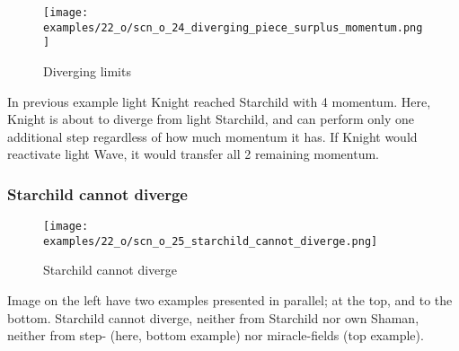 
\vspace*{0.4\baselineskip}
\noindent
\begin{wrapfigure}[9]{l}{0.4\textwidth}
\centering
\texttt{[image: examples/22\_o/scn\_o\_24\_diverging\_piece\_surplus\_momentum.png]}
\vspace*{-0.4\baselineskip}
\caption{Diverging limits}
\label{fig:scn_o_24_diverging_piece_surplus_momentum}
\end{wrapfigure}
In previous example light Knight reached Starchild with 4 momentum. Here, Knight
is about to diverge from light Starchild, and can perform only one additional step
regardless of how much momentum it has. If Knight would reactivate light Wave, it
would transfer all 2 remaining momentum.


\clearpage %

\subsubsection*{Starchild cannot diverge}
\label{sec:One/Starchild/Divergence/Starchild cannot diverge}

\vspace*{-0.9\baselineskip}
\noindent
\begin{wrapfigure}[8]{l}{0.4\textwidth}
\centering
\texttt{[image: examples/22\_o/scn\_o\_25\_starchild\_cannot\_diverge.png]}
\vspace*{-0.4\baselineskip}
\caption{Starchild cannot diverge}
\label{fig:scn_o_25_starchild_cannot_diverge}
\end{wrapfigure}
Image on the left have two examples presented in parallel; at the top, and to the
bottom.\newline
\indent
Starchild cannot diverge, neither from Starchild nor own Shaman, neither from step-
(here, bottom example) nor miracle-fields (top example).

